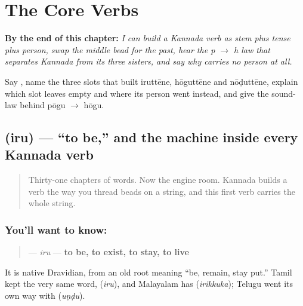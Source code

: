 
\chapter{The Core Verbs}
\label{ch:ka-core-verbs}

\begin{chapteropening}
\textbf{By the end of this chapter:} \emph{I can build a Kannada verb as stem plus tense plus person, swap the middle bead for the past, hear the p $\to$ h law that separates Kannada from its three sisters, and say why  carries no person at all.}

Say  , name the three slots that built iruttēne, hōguttēne and nōḍuttēne, explain which slot  leaves empty and where its person went instead, and give the sound-law behind pōgu $\to$ hōgu.
\end{chapteropening}

\section[\texorpdfstring{\kn{ಇರು} (iru)}{ಇರು (iru)}]{ (iru) — \textquotedblleft{}to be,\textquotedblright{} and the machine inside every Kannada verb}

\label{lesson:KA-C32-iru}



\begin{quote}
Thirty-one chapters of words. Now the engine room. Kannada builds a verb the way you thread beads on a string, and this first verb carries the whole string.
\end{quote}

\subsection*{You'll want to know: }
\begin{quote}
\textbf{} — \emph{iru} — \textbf{to be, to exist, to stay, to live}
\end{quote}

It is native Dravidian, from an old root meaning \textquotedblleft{}be, remain, stay put.\textquotedblright{} Tamil kept the very same word, \textbf{} (\emph{iru}), and Malayalam has \textbf{} (\emph{irikkuka}); Telugu went its own way with \textbf{} (\emph{uṇḍu}).

